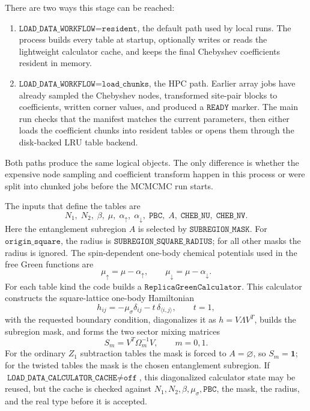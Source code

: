 \documentclass[11pt]{article}
\newcommand{\1}{\mathbf{1}}
\begin{document}
There are two ways this stage can be reached:
\begin{enumerate}[leftmargin=2em]
  \item \(\texttt{LOAD\_DATA\_WORKFLOW=resident}\), the default path used by
  local runs.  The process builds every table at startup, optionally writes or
  reads the lightweight calculator cache, and keeps the final Chebyshev
  coefficients resident in memory.
  \item \(\texttt{LOAD\_DATA\_WORKFLOW=load\_chunks}\), the HPC path.  Earlier
  array jobs have already sampled the Chebyshev nodes, transformed site-pair
  blocks to coefficients, written corner values, and produced a
  \(\texttt{READY}\) marker.  The main run checks that the manifest matches the
  current parameters, then either loads the coefficient chunks into resident
  tables or opens them through the disk-backed LRU table backend.
\end{enumerate}
Both paths produce the same logical objects.  The only difference is whether
the expensive node sampling and coefficient transform happen in this process or
were split into chunked jobs before the MCMCMC run starts.

The inputs that define the tables are
\[
  N_1,\; N_2,\; \beta,\; \mu,\; \alpha_{\uparrow},\; \alpha_{\downarrow},\;
  \texttt{PBC},\; A,\; \texttt{CHEB\_NU},\; \texttt{CHEB\_NV}.
\]
Here the entanglement subregion \(A\) is selected by
\(\texttt{SUBREGION\_MASK}\).  For \(\texttt{origin\_square}\), the radius is
\(\texttt{SUBREGION\_SQUARE\_RADIUS}\); for all other masks the radius is
ignored.  The spin-dependent one-body chemical potentials used in the free
Green functions are
\[
  \mu_{\uparrow}=\mu-\alpha_{\uparrow},\qquad
  \mu_{\downarrow}=\mu-\alpha_{\downarrow}.
\]
For each table kind the code builds a \(\texttt{ReplicaGreenCalculator}\).  This
calculator constructs the square-lattice one-body Hamiltonian
\[
  h_{ij}=-\mu_\sigma\delta_{ij}
  -t\,\delta_{\langle i,j\rangle},
  \qquad t=1,
\]
with the requested boundary condition, diagonalizes it as \(h=V\Lambda V^T\),
builds the subregion mask, and forms the two sector mixing matrices
\[
  S_m=V^T\Omega_m^{-1}V,
  \qquad m=0,1.
\]
For the ordinary \(Z_1\) subtraction tables the mask is forced to
\(A=\varnothing\), so \(S_m=\mathbf 1\); for the twisted tables the mask is the
chosen entanglement subregion.  If
\(\texttt{LOAD\_DATA\_CALCULATOR\_CACHE}\neq\texttt{off}\), this diagonalized
calculator state may be reused, but the cache is checked against
\(N_1,N_2,\beta,\mu_\sigma,\texttt{PBC}\), the mask, the radius, and the real
type before it is accepted.
\end{document}
